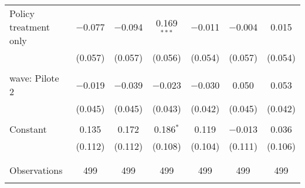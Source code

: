 \begin{tabular}{@{\extracolsep{5pt}}lcccccc}
 Policy treatment only & $-$0.077 & $-$0.094 & 0.169$^{***}$ & $-$0.011 & $-$0.004 & 0.015 \\ 
  & (0.057) & (0.057) & (0.056) & (0.054) & (0.057) & (0.054) \\ 
  & & & & & & \\ 
 wave: Pilote 2 & $-$0.019 & $-$0.039 & $-$0.023 & $-$0.030 & 0.050 & 0.053 \\ 
  & (0.045) & (0.045) & (0.043) & (0.042) & (0.045) & (0.042) \\ 
  & & & & & & \\ 
 Constant & 0.135 & 0.172 & 0.186$^{*}$ & 0.119 & $-$0.013 & 0.036 \\ 
  & (0.112) & (0.112) & (0.108) & (0.104) & (0.111) & (0.106) \\ 
  & & & & & & \\ 
\hline \\[-1.8ex] 

Observations & 499 & 499 & 499 & 499 & 499 & 499 \\ 
\hline 
\hline \\[-1.8ex] 
\end{tabular} 